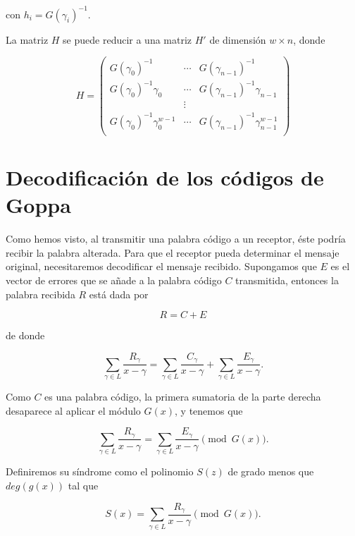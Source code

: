 con $h_i = G(\gamma_i)^{-1}$.

\begin{proposition}
    La matriz $H$ se puede reducir a una matriz $H'$ de dimensión $w \times n$, donde 

    \begin{equation}
        H = \left(
            \begin{array}{ccc} 
                G(\gamma_0)^{-1} & \cdots & G(\gamma_{n-1})^{-1}  \\
                G(\gamma_0)^{-1} \gamma_0 & \cdots & G(\gamma_{n-1})^{-1} \gamma_{n-1} \\
                & \vdots & \\
                G(\gamma_0)^{-1} \gamma_0^{w-1} & \cdots & G(\gamma_{n-1})^{-1} \gamma_{n-1}^{w-1} \\
            \end{array}
            \right)
    \end{equation}
\end{proposition}

\section{Decodificación de los códigos de Goppa}

Como hemos visto, al transmitir una palabra código a un receptor, éste podría recibir la palabra alterada. Para que el receptor pueda determinar el mensaje original, necesitaremos decodificar el mensaje recibido. Supongamos que $E$ es el vector de errores que se añade a la palabra código $C$ transmitida, entonces la palabra recibida $R$ está dada por

$$R = C + E$$

de donde 

$$\sum_{\gamma \in L} \frac{R_\gamma}{x - \gamma} = \sum_{\gamma \in L} \frac{C_\gamma}{x - \gamma} + \sum_{\gamma \in L} \frac{E_\gamma}{x - \gamma}.$$

Como $C$ es una palabra código, la primera sumatoria de la parte derecha desaparece al aplicar el módulo $G(x)$, y tenemos que

$$\sum_{\gamma \in L} \frac{R_\gamma}{x - \gamma} = \sum_{\gamma \in L} \frac{E_\gamma}{x - \gamma} \pmod{G(x)}.$$

Definiremos su síndrome como el polinomio $S(z)$ de grado menos que $deg(g(x))$ tal que 

$$S(x) = \sum_{\gamma \in L} \frac{R_\gamma}{x - \gamma} \pmod{G(x)}.$$

